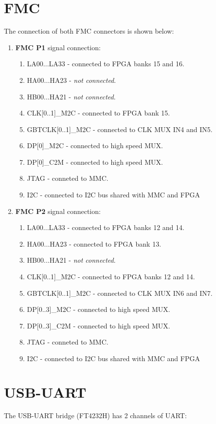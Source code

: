 \documentclass[12pt,oneside,a4]{article}
\begin{document}
\section{FMC}
The connection of both FMC connectors is shown below:
\begin{enumerate}
    \item \textbf{FMC P1} signal connection:
    \begin{enumerate}
    	\item LA00...LA33 - connected to FPGA banks 15 and 16.
    	\item HA00...HA23 - \textit{not connected}.
    	\item HB00...HA21 - \textit{not connected}. 
    	\item CLK[0..1]\_M2C - connected to FPGA bank 15. 
    	\item GBTCLK[0..1]\_M2C - connected to CLK MUX IN4 and IN5. 
    	\item DP[0]\_M2C - connected to high speed MUX.
    	\item DP[0]\_C2M - connected to high speed MUX.
    	\item JTAG - conneted to MMC.
    	\item I2C - connected to I2C bus shared with MMC and FPGA
    \end{enumerate}    
    \item \textbf{FMC P2} signal connection:
    \begin{enumerate}
    	\item LA00...LA33 - connected to FPGA banks 12 and 14.
    	\item HA00...HA23 - connected to FPGA bank 13.
    	\item HB00...HA21 - \textit{not connected}. 
    	\item CLK[0..1]\_M2C - connected to FPGA banks 12 and 14. 
    	\item GBTCLK[0..1]\_M2C - connected to CLK MUX IN6 and IN7. 
    	\item DP[0..3]\_M2C - connected to high speed MUX.
    	\item DP[0..3]\_C2M - connected to high speed MUX.
    	\item JTAG - conneted to MMC.
    	\item I2C - connected to I2C bus shared with MMC and FPGA
    \end{enumerate}
\end{enumerate}

\section{USB-UART}
The USB-UART bridge (FT4232H) has 2 channels of UART:
\end{document}
